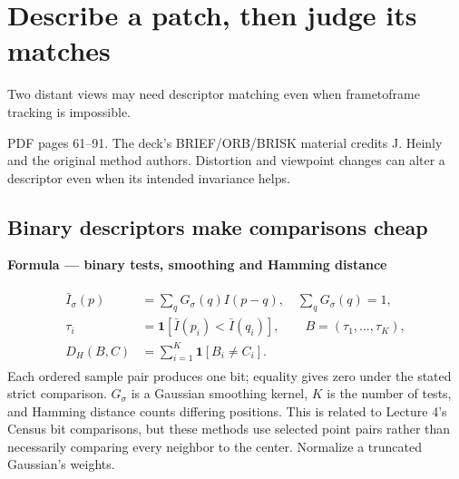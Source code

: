\documentclass[letterpaper,11pt,english,openany,oneside]{jupyterBook}
\begin{document}
\ignorespaces
{}\ignorespaces
{}\ignorespaces
\sphinxstepscope


\section{Describe a patch, then judge its matches}
\label{\detokenize{lectures/lecture05/descriptors:describe-a-patch-then-judge-its-matches}}\label{\detokenize{lectures/lecture05/descriptors:lec05-descriptors}}\label{\detokenize{lectures/lecture05/descriptors::doc}}
\sphinxAtStartPar
{} Two distant views may need descriptor matching even when frame\sphinxhyphen{}to\sphinxhyphen{}frame tracking is impossible.

\sphinxAtStartPar
{} PDF pages 61–91. The deck’s BRIEF/ORB/BRISK material credits J. Heinly and the original method authors. Distortion and viewpoint changes can alter a descriptor even when its intended invariance helps.


\subsection{Binary descriptors make comparisons cheap}
\label{\detokenize{lectures/lecture05/descriptors:binary-descriptors-make-comparisons-cheap}}
\begin{TextbookBox}
\textbf{Formula — binary tests, smoothing and Hamming distance}\par\smallskip
\begin{equation}\label{equation:lectures/lecture05/descriptors:eq-lec05-binary}
\begin{split}\begin{aligned}
\bar I_\sigma(p)&=\sum_q G_\sigma(q)I(p-q),\quad \sum_qG_\sigma(q)=1,\\
\tau_i&=\mathbf1[\bar I(p_i)<\bar I(q_i)],\qquad
B=(\tau_1,\ldots,\tau_K),\\
D_H(B,C)&=\sum_{i=1}^K\mathbf1[B_i\ne C_i].
\end{aligned}\end{split}
\end{equation}
\sphinxAtStartPar
Each ordered sample pair produces one bit; equality gives zero under the stated strict comparison. \(G_\sigma\) is a Gaussian smoothing kernel, \(K\) is the number of tests, and Hamming distance counts differing positions. This is related to Lecture 4’s Census bit comparisons, but these methods use selected point pairs rather than necessarily comparing every neighbor to the center. Normalize a truncated Gaussian’s weights.

\end{TextbookBox}
\end{document}
